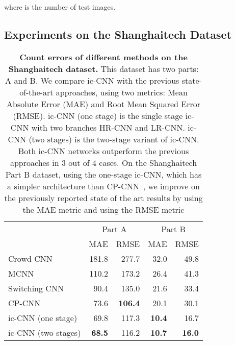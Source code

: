 \documentclass[runningheads]{llncs}
\begin{document}
where  is the number of test images. 


\subsection{Experiments on the Shanghaitech Dataset}


\setlength{\tabcolsep}{14pt}
\begin{table}[t]
\begin{center}	
\caption{{\bf Count errors of different methods on the Shanghaitech dataset.}  This dataset has two parts: A and B. We compare  ic-CNN with the previous state-of-the-art approaches, using two metrics: Mean Absolute Error (MAE) and Root Mean Squared Error (RMSE). ic-CNN (one stage) is the single stage ic-CNN with two branches HR-CNN and LR-CNN. ic-CNN (two stages) is the two-stage variant of ic-CNN. Both ic-CNN networks outperform the previous approaches in 3 out of 4 cases. On the Shanghaitech Part B dataset, using the one-stage ic-CNN, which has a simpler architecture than CP-CNN~\cite{sindagi2017generating}, we improve on the previously reported state of the art results by   using the MAE metric and   using the RMSE metric  \label{table_shanghaitech}
}
\begin{tabular}{lrrrr}
\toprule
         & \multicolumn{2}{c}{Part A} & \multicolumn{2}{c}{Part B} \\
         \cmidrule(lr){2-3} \cmidrule(lr){4-5} 
               & MAE          & RMSE         & MAE          & RMSE         \\
\midrule
Crowd CNN~\cite{zhang2015cross}     &        181.8      &  277.7           &   32.0           &  49.8           \\



MCNN~\cite{zhang2016single}           &         110.2     &    173.2         &  26.4            &  41.3           \\
Switching CNN~\cite{sam2017switching}  &   90.4           &  135.0           &     21.6         &     33.4        \\
CP-CNN~\cite{sindagi2017generating}  & 73.6 &\textbf{106.4} &20.1 & 30.1  \\
ic-CNN (one stage) & 69.8&117.3& \textbf{10.4}& 16.7\\
ic-CNN (two stages)  &\textbf{68.5}&116.2& \textbf{10.7}& \textbf{16.0}\\
\bottomrule
\end{tabular}
\end{center}
\end{table}
\end{document}
